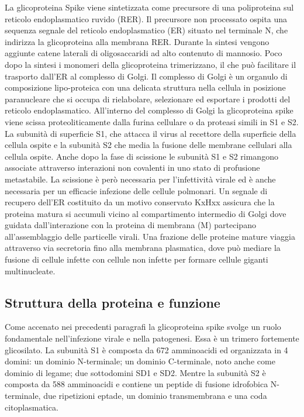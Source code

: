 La glicoproteina Spike viene sintetizzata come precursore di una poliproteina sul reticolo endoplasmatico ruvido (RER). Il precursore non processato ospita una sequenza segnale del reticolo endoplasmatico (ER) situato nel terminale N, che indirizza la glicoproteina alla membrana RER. Durante la sintesi vengono aggiunte catene laterali di oligosaccaridi ad alto contenuto di mannosio. Poco dopo la sintesi i monomeri della glicoproteina trimerizzano, il che può facilitare il trasporto dall'ER al complesso di Golgi. Il complesso di Golgi è un organulo di composizione lipo-proteica con una delicata struttura nella cellula in posizione paranucleare che si occupa di rielabolare, selezionare ed esportare i prodotti del reticolo endoplasmatico. All'interno del complesso di Golgi la glicoproteina spike viene scissa proteoliticamente dalla furina cellulare o da proteasi simili in S1 e S2. La subunità di superficie S1, che attacca il virus al recettore della superficie della cellula ospite e la subunità S2 che media la fusione delle membrane cellulari alla cellula ospite. Anche dopo la fase di scissione le subunità S1 e S2 rimangono associate attraverso interazioni non covalenti in uno stato di profusione metastabile. La scissione è però necessaria per l'infettività virale ed è anche necessaria per un efficacie infezione delle cellule polmonari. Un segnale di recupero dell'ER costituito da un motivo conservato KxHxx assicura che la proteina matura si accumuli vicino al compartimento intermedio di Golgi dove guidata dall'interazione con la proteina di membrana (M) partecipano all'assemblaggio delle particelle virali. Una frazione delle proteine mature viaggia attraverso via secretoria fino alla membrana plasmatica, dove può mediare la fusione di cellule infette con cellule non infette per formare cellule giganti multinucleate.

\subsection{Struttura della proteina e funzione}\label{subsec:es_subsec}
Come accenato nei precedenti paragrafi la glicoproteina spike svolge un ruolo fondamentale nell'infezione virale e nella patogenesi. Essa è un trimero fortemente glicosilato. La subunità S1 è composta da 672 amminoacidi ed organizzata in 4 domini: un dominio N-terminale; un dominio C-terminale, noto anche come dominio di legame; due sottodomini SD1 e SD2. Mentre la subunità S2 è composta da 588 amminoacidi e contiene un peptide di fusione idrofobica N-terminale, due ripetizioni eptade, un dominio transmembrana e una coda citoplasmatica.

